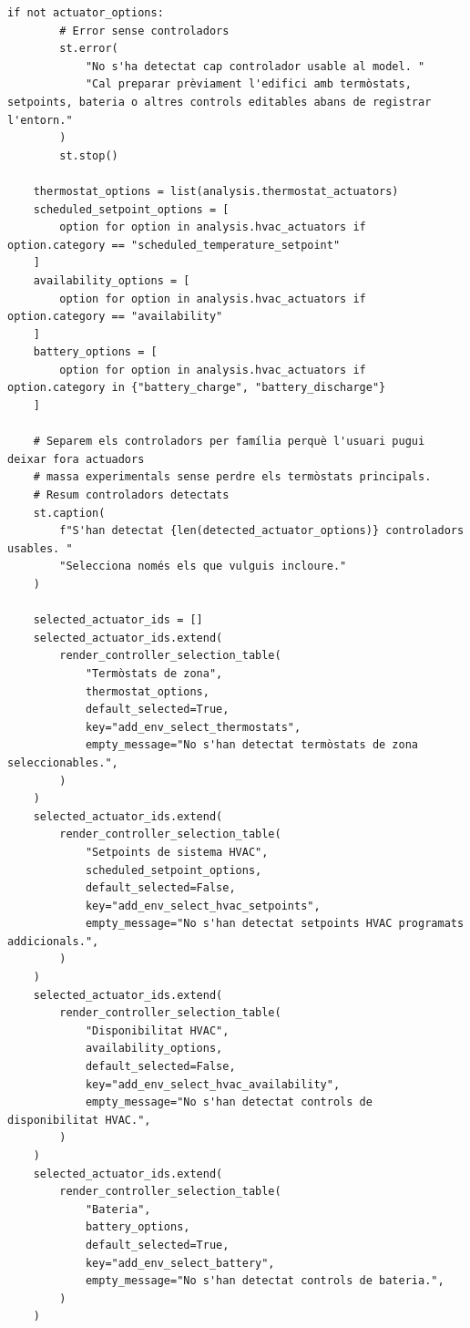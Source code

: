 \documentclass[10pt,a4paper]{article}
\begin{document}
\begin{lstlisting}[style=studioPython,caption={pages/Afegir\_Entorn.py},label={lst:pages-afegir-entorn-py}]
    if not actuator_options:
        # Error sense controladors
        st.error(
            "No s'ha detectat cap controlador usable al model. "
            "Cal preparar prèviament l'edifici amb termòstats, setpoints, bateria o altres controls editables abans de registrar l'entorn."
        )
        st.stop()

    thermostat_options = list(analysis.thermostat_actuators)
    scheduled_setpoint_options = [
        option for option in analysis.hvac_actuators if option.category == "scheduled_temperature_setpoint"
    ]
    availability_options = [
        option for option in analysis.hvac_actuators if option.category == "availability"
    ]
    battery_options = [
        option for option in analysis.hvac_actuators if option.category in {"battery_charge", "battery_discharge"}
    ]

    # Separem els controladors per família perquè l'usuari pugui deixar fora actuadors
    # massa experimentals sense perdre els termòstats principals.
    # Resum controladors detectats
    st.caption(
        f"S'han detectat {len(detected_actuator_options)} controladors usables. "
        "Selecciona només els que vulguis incloure."
    )

    selected_actuator_ids = []
    selected_actuator_ids.extend(
        render_controller_selection_table(
            "Termòstats de zona",
            thermostat_options,
            default_selected=True,
            key="add_env_select_thermostats",
            empty_message="No s'han detectat termòstats de zona seleccionables.",
        )
    )
    selected_actuator_ids.extend(
        render_controller_selection_table(
            "Setpoints de sistema HVAC",
            scheduled_setpoint_options,
            default_selected=False,
            key="add_env_select_hvac_setpoints",
            empty_message="No s'han detectat setpoints HVAC programats addicionals.",
        )
    )
    selected_actuator_ids.extend(
        render_controller_selection_table(
            "Disponibilitat HVAC",
            availability_options,
            default_selected=False,
            key="add_env_select_hvac_availability",
            empty_message="No s'han detectat controls de disponibilitat HVAC.",
        )
    )
    selected_actuator_ids.extend(
        render_controller_selection_table(
            "Bateria",
            battery_options,
            default_selected=True,
            key="add_env_select_battery",
            empty_message="No s'han detectat controls de bateria.",
        )
    )


\end{lstlisting}
\end{document}
